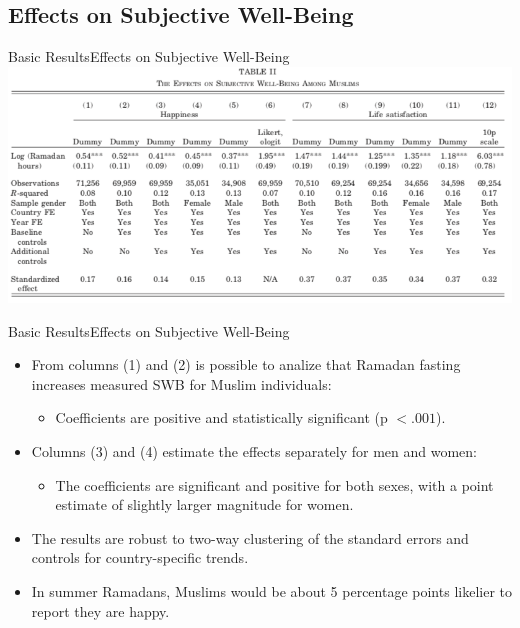 \documentclass[pdftex,12pt,xcolor=pdftex,table]{beamer}
\begin{document}
\subsection{Effects on Subjective Well-Being}
    \begin{frame}{Basic Results}{Effects on Subjective Well-Being}
    \vspace{-0.57cm}
    \centering\includegraphics[scale=0.4]{Reg2.png}
    \end{frame}
    
   \begin{frame}{Basic Results}{Effects on Subjective Well-Being}
     \begin{itemize}
        \item From columns (1) and (2) is possible to analize that Ramadan fasting increases measured SWB for Muslim individuals:
        \begin{itemize}
            \item<2-> Coefficients are positive and statistically significant (p $< .001$).
            
        \end{itemize}
        \item<3-> Columns (3) and (4) estimate the effects separately for men and women:
        \begin{itemize}
            \item<4-> The coefficients are significant and positive for both sexes, with a point estimate of slightly larger magnitude for women.
        \end{itemize}
        \item<5-> The results are robust to two-way clustering of the standard errors and controls for country-specific trends.
        \item<6-> In summer Ramadans, Muslims would be about 5 percentage points likelier to report they are happy.
    \end{itemize}
    \end{frame}    
 
\end{document}
